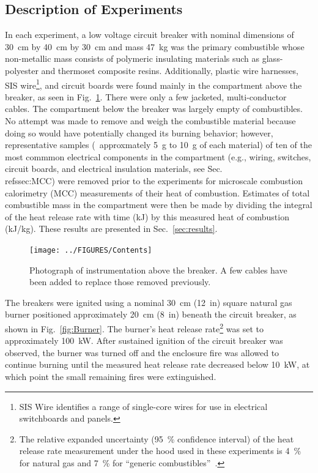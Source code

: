 \documentclass[12pt]{article}
\begin{document}
\subsection{Description of Experiments}

In each experiment, a low voltage circuit breaker with nominal dimensions of 30~cm by 40~cm by 30~cm and mass 47~kg was the primary combustible whose non-metallic mass consists of polymeric insulating materials such as glass-polyester and thermoset composite resins. Additionally, plastic wire harnesses, SIS wire\footnote{SIS Wire identifies a range of single-core wires for use in electrical switchboards and panels.}, and circuit boards were found mainly in the compartment above the breaker, as seen in Fig.~\ref{fig:Contents}. There were only a few jacketed, multi-conductor cables. The compartment below the breaker was largely empty of combustibles. No attempt was made to remove and weigh the combustible material because doing so would have potentially changed its burning behavior; however, representative samples (~approxmately 5~g to 10~g of each material) of ten of the most commmon electrical components in the compartment (e.g., wiring, switches, circuit boards, and electrical insulation materials, see Sec.~\\ref{ssec:MCC}) were removed prior to the experiments for microscale combustion calorimetry (MCC) measurements of their heat of combustion. Estimates of total combustible mass in the compartment were then be made by dividing the integral of the heat release rate with time (kJ) by this measured heat of combustion (kJ/kg). These results are presented in Sec.~\ref{sec:results}.

\begin{figure}[ht]
\centering
\texttt{[image: ../FIGURES/Contents]}
\caption[Photograph of instrumentation above the breaker] {Photograph of instrumentation above the breaker. A few cables have been added to replace those removed previously.}
\label{fig:Contents}
\end{figure}

The breakers were ignited using a nominal 30~cm (12~in) square natural gas burner positioned approximately 20~cm (8~in) beneath the circuit breaker, as shown in Fig.~\ref{fig:Burner}. The burner's heat release rate\footnote{The relative expanded uncertainty (95~\% confidence interval) of the heat release rate measurement under the hood used in these experiments is 4~\% for natural gas and 7~\% for ``generic combustibles''~\cite{bryant2019nist}.} was set to approximately 100~kW. After sustained ignition of the circuit breaker was observed, the burner was turned off and the enclosure fire was allowed to continue burning until the measured heat release rate decreased below 10~kW, at which point the small remaining fires were extinguished.
\end{document}
